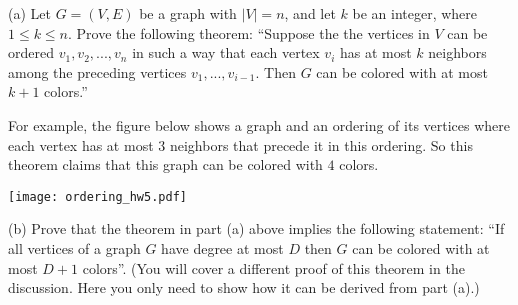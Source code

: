 
\begin{problem}
(a) Let $G = (V,E)$ be a graph with $|V| = n$, and let $k$ be an integer, where $1\le k\le n$.
Prove the following theorem:
``Suppose the the vertices in $V$ can be ordered $v_1,v_2,...,v_n$ in such a way
that each vertex $v_i$ has at most $k$ neighbors among the preceding
vertices $v_1,...,v_{i-1}$. Then $G$ can be colored with at most $k+1$ colors.''

For example, the figure below shows a graph and an ordering of its
vertices where each vertex has at most $3$ neighbors that precede it in this
ordering. So this theorem claims that this graph can be colored with $4$ colors.

	\begin{center}
	\texttt{[image: ordering\_hw5.pdf]}
	\end{center}

\noindent
(b)
Prove that the theorem in part (a) above implies the following
statement: ``If all vertices of a graph $G$ have degree at most $D$
then $G$ can be colored with at most $D+1$ colors''.
(You will cover a different proof of this theorem in the discussion. Here you
only need to show how it can be derived from part (a).)

\end{problem}

